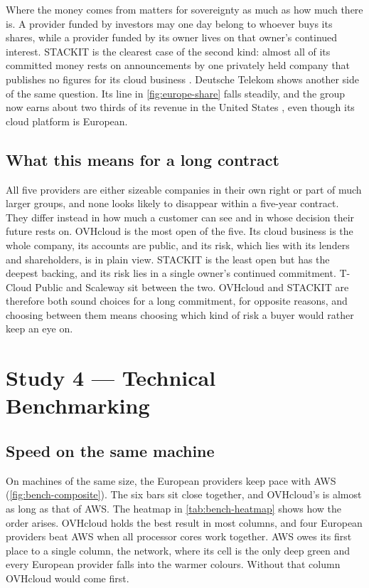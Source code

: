 Where the money comes from matters for sovereignty as much as how much there is.
A provider funded by investors may one day belong to whoever buys its shares,
while a provider funded by its owner lives on that owner's continued interest.
STACKIT is the clearest case of the second kind: almost all of its committed money
rests on announcements by one privately held company that publishes no figures
for its cloud business \cite{Schwarz_Figures_FY2025}. Deutsche Telekom shows
another side of the same question. Its line in \cref{fig:europe-share} falls
steadily, and the group now earns about two thirds of its revenue in the United
States \cite{DT_AR_2025}, even though its cloud platform is European.

\subsection{What this means for a long contract}
\label{subsec:study3-interpretation}

All five providers are either sizeable companies in their own right or part of
much larger groups, and none looks likely to disappear within a five-year
contract. They differ instead in how much a customer can see and in whose
decision their future rests on. OVHcloud is the most open of the five. Its cloud
business is the whole company, its accounts are public, and its risk, which lies
with its lenders and shareholders, is in plain view. STACKIT is the least open but
has the deepest backing, and its risk lies in a single owner's continued
commitment. T-Cloud Public and Scaleway sit between the two. OVHcloud and STACKIT
are therefore both sound choices for a long commitment, for opposite reasons, and
choosing between them means choosing which kind of risk a buyer would rather keep
an eye on.

\section{Study 4 --- Technical Benchmarking}
\label{sec:study4}

\subsection{Speed on the same machine}
\label{subsec:study4-results}

On machines of the same size, the European providers keep pace with \acs{AWS}
(\cref{fig:bench-composite}). The six bars sit close together, and OVHcloud's is
almost as long as that of \acs{AWS}. The heatmap in \cref{tab:bench-heatmap}
shows how the order arises. OVHcloud holds the best result in most columns, and
four European providers beat \acs{AWS} when all processor cores work together.
\acs{AWS} owes its first place to a single column, the network, where its cell is
the only deep green and every European provider falls into the warmer colours.
Without that column OVHcloud would come first.


